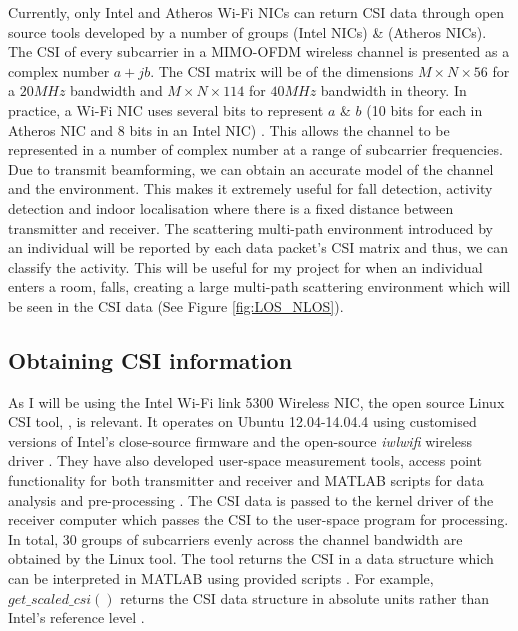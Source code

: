 Currently, only Intel and Atheros Wi-Fi NICs can return CSI data through open source tools developed by a number of groups \cite{Halperin_csitool} (Intel NICs) \& \cite{Xie:2015:PPD:2789168.2790124} (Atheros NICs). The CSI of every subcarrier in a MIMO-OFDM wireless channel is presented as a complex number $a+jb$. The CSI matrix will be of the dimensions $M\times N\times 56$ for a $20MHz$ bandwidth and $M\times N\times 114$ for $40MHz$ bandwidth in theory. In practice, a Wi-Fi NIC uses several bits to represent $a$ \& $b$ (10 bits for each in Atheros NIC and 8 bits in an Intel NIC) \citep{Xie:2015:PPD:2789168.2790124}. This allows the channel to be represented in a number of complex number at a range of subcarrier frequencies. Due to transmit beamforming, we can obtain an accurate model of the channel and the environment. This makes it extremely useful for fall detection, activity detection and indoor localisation where there is a fixed distance between transmitter and receiver. The scattering multi-path environment introduced by an individual will be reported by each data packet's CSI matrix and thus, we can classify the activity. This will be useful for my project for when an individual enters a room, falls, creating a large multi-path scattering environment which will be seen in the CSI data (See Figure \ref{fig:LOS_NLOS}).
\subsection{Obtaining CSI information}
As I will be using the Intel Wi-Fi link 5300 Wireless NIC, the open source Linux CSI tool, \cite{Halperin_csitool}, is relevant. It operates on Ubuntu 12.04-14.04.4 using customised versions of Intel's close-source firmware and the open-source \textit{iwlwifi} wireless driver \citep{Halperin_csitool}. 
They have also developed user-space measurement tools, access point functionality for both transmitter and receiver and MATLAB scripts for data analysis and pre-processing \citep{Halperin_csitool}. 
The CSI data is passed to the kernel driver of the receiver computer which passes the CSI to the user-space program for processing.
In total, 30 groups of subcarriers evenly across the channel bandwidth are obtained by the Linux tool. The tool returns the CSI in a data structure which can be interpreted in MATLAB using provided scripts \citep{Halperin_csitool}.
For example, $get\_scaled\_csi()$ returns the CSI data structure in absolute units rather than Intel's reference level \citep{Halperin_csitool}. 
